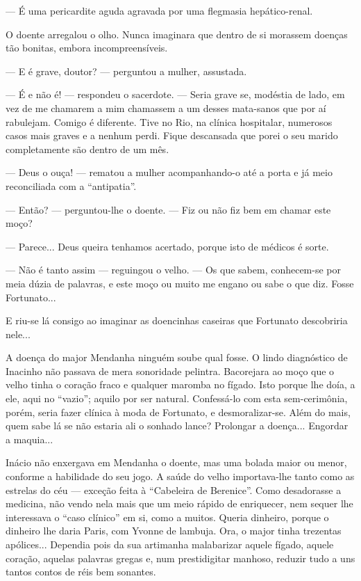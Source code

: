 --- É uma pericardite aguda agravada por uma flegmasia hepático-renal.

O doente arregalou o olho. Nunca imaginara que dentro de si morassem
doenças tão bonitas, embora incompreensíveis.

--- E é grave, doutor? --- perguntou a mulher, assustada.

--- É e não é! --- respondeu o sacerdote. --- Seria grave se, modéstia
de lado, em vez de me chamarem a mim chamassem a um desses mata-sanos
que por aí rabulejam. Comigo é diferente. Tive no Rio, na clínica
hospitalar, numerosos casos mais graves e a nenhum perdi. Fique
descansada que porei o seu marido completamente são dentro de um mês.

--- Deus o ouça! --- rematou a mulher acompanhando-o até a porta e já
meio reconciliada com a ``antipatia''.

--- Então? --- perguntou-lhe o doente. --- Fiz ou não fiz bem em chamar
este moço?

--- Parece... Deus queira tenhamos acertado, porque isto de médicos é
sorte.

--- Não é tanto assim --- reguingou o velho. --- Os que sabem,
conhecem-se por meia dúzia de palavras, e este moço ou muito me engano
ou sabe o que diz. Fosse Fortunato...

E riu-se lá consigo ao imaginar as doencinhas caseiras que Fortunato
descobriria nele...

A doença do major Mendanha ninguém soube qual fosse. O lindo diagnóstico
de Inacinho não passava de mera sonoridade pelintra. Bacorejara ao moço
que o velho tinha o coração fraco e qualquer maromba no fígado. Isto
porque lhe doía, a ele, aqui no ``vazio''; aquilo por ser natural.
Confessá-lo com esta sem-cerimônia, porém, seria fazer clínica à moda de
Fortunato, e desmoralizar-se. Além do mais, quem sabe lá se não estaria
ali o sonhado lance? Prolongar a doença... Engordar a maquia...

Inácio não enxergava em Mendanha o doente, mas uma bolada maior ou
menor, conforme a habilidade do seu jogo. A saúde do velho importava-lhe
tanto como as estrelas do céu --- exceção feita à ``Cabeleira de
Berenice''. Como desadorasse a medicina, não vendo nela mais que um meio
rápido de enriquecer, nem sequer lhe interessava o ``caso clínico'' em
si, como a muitos. Queria dinheiro, porque o dinheiro lhe daria Paris,
com Yvonne de lambuja. Ora, o major tinha trezentas apólices... Dependia
pois da sua artimanha malabarizar aquele fígado, aquele coração, aquelas
palavras gregas e, num prestidigitar manhoso, reduzir tudo a uns tantos
contos de réis bem sonantes.

